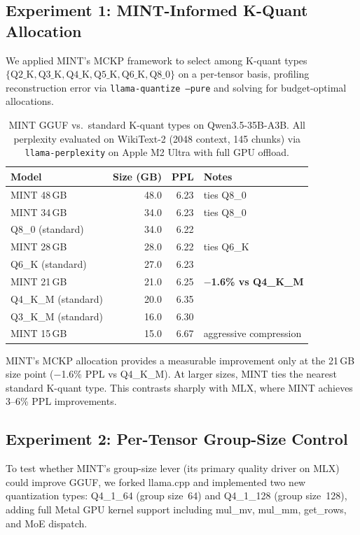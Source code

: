 \documentclass{article}
\begin{document}
\subsection{Experiment 1: MINT-Informed K-Quant Allocation}

We applied MINT's MCKP framework to select among K-quant types $\{\text{Q2\_K}, \text{Q3\_K}, \text{Q4\_K}, \text{Q5\_K}, \text{Q6\_K}, \text{Q8\_0}\}$ on a per-tensor basis, profiling reconstruction error via \texttt{llama-quantize --pure} and solving for budget-optimal allocations.

\begin{table}[h]
\centering
\caption{MINT GGUF vs.\ standard K-quant types on Qwen3.5-35B-A3B. All perplexity evaluated on WikiText-2 (2048 context, 145 chunks) via \texttt{llama-perplexity} on Apple M2 Ultra with full GPU offload.}
\label{tab:gguf_results}
\begin{tabular}{lrrl}
\toprule
\textbf{Model} & \textbf{Size (GB)} & \textbf{PPL} & \textbf{Notes} \\
\midrule
MINT 48\,GB & 48.0 & 6.23 & ties Q8\_0 \\
MINT 34\,GB & 34.0 & 6.23 & ties Q8\_0 \\
Q8\_0 (standard) & 34.0 & 6.22 & \\
MINT 28\,GB & 28.0 & 6.22 & ties Q6\_K \\
Q6\_K (standard) & 27.0 & 6.23 & \\
MINT 21\,GB & 21.0 & 6.25 & \textbf{$-$1.6\% vs Q4\_K\_M} \\
Q4\_K\_M (standard) & 20.0 & 6.35 & \\
Q3\_K\_M (standard) & 16.0 & 6.30 & \\
MINT 15\,GB & 15.0 & 6.67 & aggressive compression \\
\bottomrule
\end{tabular}
\end{table}

MINT's MCKP allocation provides a measurable improvement only at the 21\,GB size point ($-$1.6\% PPL vs Q4\_K\_M). At larger sizes, MINT ties the nearest standard K-quant type. This contrasts sharply with MLX, where MINT achieves 3--6\% PPL improvements.

\subsection{Experiment 2: Per-Tensor Group-Size Control}

To test whether MINT's group-size lever (its primary quality driver on MLX) could improve GGUF, we forked llama.cpp and implemented two new quantization types: Q4\_1\_64 (group size~64) and Q4\_1\_128 (group size~128), adding full Metal GPU kernel support including mul\_mv, mul\_mm, get\_rows, and MoE dispatch.
\end{document}
